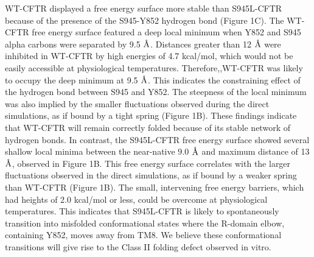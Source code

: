 WT-CFTR displayed a free energy surface more stable than S945L-CFTR because of the presence of the S945-Y852 hydrogen bond (Figure 1C). The WT-CFTR free energy surface featured a deep local minimum when Y852 and S945 alpha carbons were separated by 9.5 $\mbox{\textup{\AA}}$. Distances greater than 12 $\mbox{\textup{\AA}}$ were inhibited in WT-CFTR by high energies of 4.7 kcal/mol, which would not be easily accessible at physiological temperatures. Therefore,,WT-CFTR  was likely to occupy the deep minimum at 9.5 $\mbox{\textup{\AA}}$. This indicates the constraining effect of the hydrogen bond between S945 and Y852.  The steepness of the local minimum was also implied by the smaller fluctuations observed during the direct simulations, as if bound by a tight spring (Figure 1B). These findings indicate that WT-CFTR will remain correctly folded because of its stable network of hydrogen bonds. In contrast, the S945L-CFTR free energy surface showed several shallow local minima between the near-native 9.0 $\mbox{\textup{\AA}}$ and maximum distance of 13 $\mbox{\textup{\AA}}$, observed in Figure 1B. This free energy surface correlates with the larger fluctuations observed in the direct simulations, as if bound by a weaker spring than WT-CFTR (Figure 1B). The small, intervening free energy barriers, which had heights of 2.0 kcal/mol or less, could be overcome at physiological temperatures. This indicates that S945L-CFTR is likely to spontaneously transition into misfolded conformational states where the R-domain elbow, containing Y852, moves away from TM8. We believe these conformational transitions will give rise to the Class II folding defect observed in vitro. 

